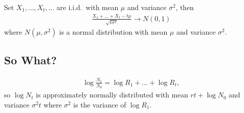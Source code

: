 \documentclass{article}
\begin{document}
        Set $X_1, \dots, X_t, \dots$ are i.i.d.~with mean $\mu$ and variance $\sigma^2$, then
        \begin{align}
            \frac{X_1 + \dots + X_t - t\mu}{\sqrt{t\sigma^2}} \rightarrow N(0,1)
        \end{align}
        where $N(\mu,\sigma^2)$ is a normal distribution with mean $\mu$ and variance $\sigma^2$.

        \subsection{So What?}
            \begin{align}
                \log\frac{N_t}{N_0} = \log R_1 + \dots + \log R_t,
            \end{align}
            so $\log N_t$ is approximately normally distributed with mean $rt + \log N_0$ and variance $\sigma^2 t$ where $\sigma^2$ is the variance of $\log R_1$.
\end{document}
